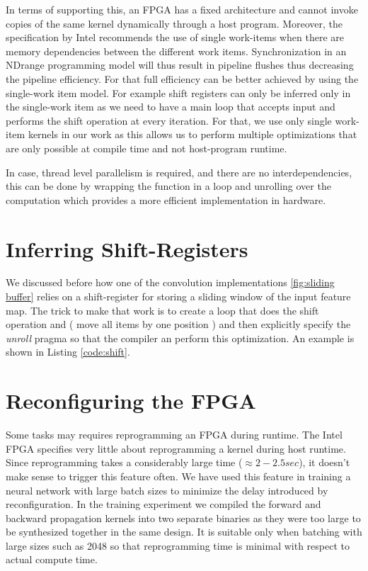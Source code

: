 In terms of supporting this, an FPGA has a fixed architecture and cannot invoke copies of the same kernel dynamically through a host program. Moreover, the specification by Intel recommends the use of single work-items when there are memory dependencies between the different work items. Synchronization in an NDrange programming model will thus result in pipeline flushes thus decreasing the pipeline efficiency. For that full efficiency can be better achieved by using the single-work item model. For example shift registers can only be inferred only in the single-work item as we need to have a main loop that accepts input and performs the shift operation at every iteration. For that, we use only single work-item kernels in our work as this allows us to perform multiple optimizations that are only possible at compile time and not host-program runtime. 

In case, thread level parallelism is required, and there are no interdependencies, this can be done by wrapping the function in a loop and unrolling over the computation which provides a more efficient implementation in hardware. 

\section{Inferring Shift-Registers} \label{shiftinf}

We discussed before how one of the convolution implementations \ref{fig:sliding buffer} relies on a shift-register for storing a sliding window of the input feature map. The trick to make that work is to create a loop that does the shift operation and ( move all items by one position ) and then explicitly specify the \emph{unroll} pragma so that the compiler an perform this optimization. An example is shown in Listing \ref{code:shift}.

 \label{code:shift}

\section{Reconfiguring the FPGA}

Some tasks may requires reprogramming an FPGA during runtime. The Intel FPGA specifies very little about reprogramming a kernel during host runtime. Since reprogramming takes a considerably large time ($\approx 2 - 2.5 sec $), it doesn’t make sense to trigger this feature often. We have used this feature in training a neural network with large batch sizes to minimize the delay introduced by reconfiguration. In the training experiment we compiled the forward and backward propagation kernels into two separate binaries as they were too large to be synthesized together in the same design. It is suitable only when batching with large sizes such as 2048 so that reprogramming time is minimal with respect to actual compute time. 

